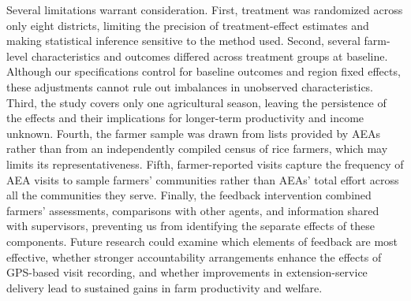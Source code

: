 \documentclass[11pt]{article}
\begin{document}
Several limitations warrant consideration. First, treatment was randomized across only eight districts, limiting the precision of treatment-effect estimates and making statistical inference sensitive to the method used. Second, several farm-level characteristics and outcomes differed across treatment groups at baseline. Although our specifications control for baseline outcomes and region fixed effects, these adjustments cannot rule out imbalances in unobserved characteristics. Third, the study covers only one agricultural season, leaving the persistence of the effects and their implications for longer-term productivity and income unknown. Fourth, the farmer sample was drawn from lists provided by AEAs rather than from an independently compiled census of rice farmers, which may limits its representativeness. Fifth, farmer-reported visits capture the frequency of AEA visits to sample farmers' communities rather than AEAs' total effort across all the communities they serve. Finally, the feedback intervention combined farmers' assessments, comparisons with other agents, and information shared with supervisors, preventing us from identifying the separate effects of these components. Future research could examine which elements of feedback are most effective, whether stronger accountability arrangements enhance the effects of GPS-based visit recording, and whether improvements in extension-service delivery lead to sustained gains in farm productivity and welfare.


\clearpage
\printbibliography


\clearpage
\appendix
\setcounter{figure}{0}
\setcounter{table}{0}
\renewcommand{\thefigure}{A\arabic{figure}}
\renewcommand{\thetable}{A\arabic{table}}
\end{document}
